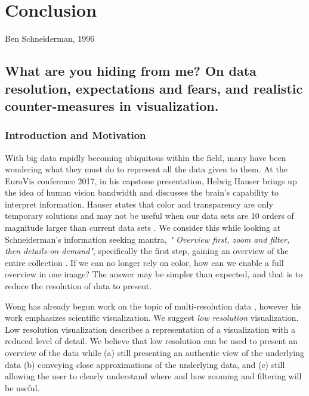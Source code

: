 \chapter{Conclusion}
\label{chap:conclusion}

{Ben Schneiderman, 1996}

\newpage
{\footnotesize \hypersetup{linkcolor=black}
\minitoc}

\section{What are you hiding from me? On data resolution, expectations and fears, and realistic counter-measures in visualization.}
\subsection{Introduction and Motivation}
With big data rapidly becoming ubiquitous within the field, many have been wondering what they must do to represent all the data given to them. At the EuroVis conference 2017, in his capstone presentation, Helwig Hauser brings up the idea of human vision bandwidth and discusses the brain's capability to interpret information. Hauser states that color and transparency are only temporary solutions and may not be useful when our data sets are 10 orders of magnitude larger than current data sets \cite{hauser2019from}. We consider this while looking at Schneiderman's information seeking mantra, \emph{" Overview first, zoom and filter, then details-on-demand"}, specifically the first step, gaining an overview of the entire collection \cite{shneiderman1996eyes}. If we can no longer rely on color, how can we enable a full overview in one image? The answer may be simpler than expected, and that is to reduce the resolution of data to present.

Wong has already begun work on the topic of multi-resolution data \cite{wong1997adaptive}, however his work emphasizes scientific visualization. We suggest \textit{low resolution} visualization. Low resolution visualization describes a representation of a visualization with a reduced level of detail. We believe that low resolution can be used to present an overview of the data while (a) still presenting an authentic view of the underlying data (b) conveying close approximations of the underlying data, and (c) still allowing the user to clearly understand where and how zooming and filtering will be useful. 

